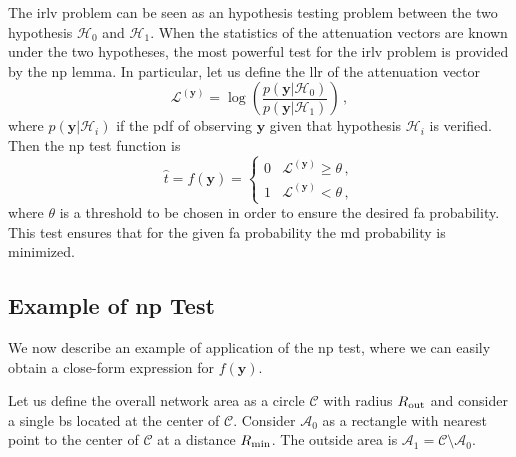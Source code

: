 \documentclass[conference,draftcls,onecolumn]{IEEEtran}
\begin{document}
The \ac{irlv} problem can be seen as an hypothesis testing problem between the two hypothesis $\mathcal H_0$ and $\mathcal H_1$. When the statistics of the attenuation vectors are known under the two hypotheses, the most powerful test for the \ac{irlv} problem is provided by the \ac{np} lemma. In particular, let us  define the \ac{llr} of the attenuation vector
\begin{equation}\label{eq:lr}
    \mathcal{L}^{(\bm{y})}=\log\left(\frac{p(\bm{y}|\mathcal{H}_0)}{p(\bm{y}|\mathcal{H}_1)}\right)\,,
\end{equation}
where $p(\bm{y}|\mathcal{H}_i)$ if the \ac{pdf} of observing $\bm{y}$ given that hypothesis $\mathcal H_i$ is verified. Then the \ac{np} test function is 
\begin{equation}
\label{eq:thrOpt}
    \hat{t} = f(\bm{y}) = \begin{cases}
    0 & \mathcal{L}^{(\bm{y})} \geq \theta\,, \\ 
    1 & \mathcal{L}^{(\bm{y})} < \theta\,, 
    \end{cases}
\end{equation}
where $\theta$ is a threshold to be chosen in order to ensure the desired \ac{fa} probability. This test ensures that for the given \ac{fa} probability the \ac{md} probability is minimized. 

\subsection{Example of \ac{np} Test}
\label{sec:los}
We now describe an example of application of the \ac{np} test, where we can easily obtain a close-form expression for $f(\bm{y})$. 

Let us define the overall network area as a circle $\mathcal{C}$ with radius $R_{\rm out}$ and consider a single \ac{bs} located at the center of $\mathcal{C}$. Consider $\mathcal{A}_{0}$ as a rectangle with nearest point to the center of $\mathcal{C}$ at a distance $R_{\rm min}$. The outside area is $\mathcal{A}_1 = \mathcal{C} \setminus \mathcal{A}_0$.
\end{document}

